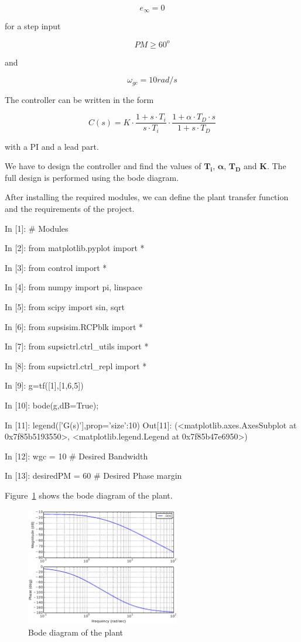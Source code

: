 $$
e_{\infty} = 0
$$ 
 
for a step input
 
$$
PM\geq60^o
$$
 
and
 
$$
\omega_{gc} = 10rad/s
$$

The controller can be written in the form

$$
C(s) = K \cdot \frac{1+s \cdot T_i}{s \cdot T_i} \cdot \frac{1+\alpha \cdot T_D 
\cdot s}{1+ s \cdot T_D}
$$

with a PI and a lead part.

We have to design the controller and find the values of $\mathbf{T_i}$, 
$\mathbf{\alpha}$, 
$\mathbf{T_D}$ and $\mathbf{K}$. The full design is performed using the bode 
diagram.

After installing the required modules, we can define the plant transfer 
function and the requirements of the project.
 
\begin{code}
In [1]: # Modules

In [2]: from matplotlib.pyplot import *

In [3]: from control import *

In [4]: from numpy import pi, linspace

In [5]: from scipy import sin, sqrt

In [6]: from supsisim.RCPblk import *

In [7]: from supsictrl.ctrl_utils import *

In [8]: from supsictrl.ctrl_repl import *

In [9]: g=tf([1],[1,6,5])

In [10]: bode(g,dB=True);

In [11]: legend(['G(s)'],prop={'size':10})
Out[11]: 
(<matplotlib.axes.AxesSubplot at 0x7f85b5193550>,
 <matplotlib.legend.Legend at 0x7f85b47e6950>)

In [12]: wgc = 10         # Desired Bandwidth

In [13]: desiredPM = 60   # Desired Phase margin
\end{code}

Figure~\ref{F10} shows the bode diagram of the plant.

\begin{figure}[htbp]	%
\centering
\includegraphics[width=0.6\textwidth]{eps/bodeplant.eps}
\caption{Bode diagram of the plant}
\label{F10}
\end{figure}

